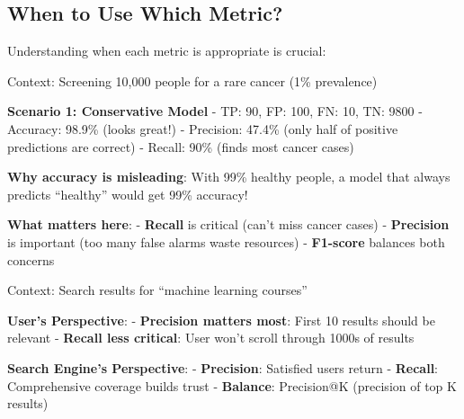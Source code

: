 \documentclass{article}
\newcounter{example}
\begin{document}
\begin{center}
\end{center}

\subsection{When to Use Which Metric?}

Understanding when each metric is appropriate is crucial:

\begin{tcolorbox}[colback=yellow!5!white,colframe=yellow!75!black,title=Example \stepcounter{example}\#\theexample: Medical Diagnosis - Cancer Detection]
Context: Screening 10,000 people for a rare cancer (1\% prevalence)

\textbf{Scenario 1: Conservative Model}
- TP: 90, FP: 100, FN: 10, TN: 9800
- Accuracy: 98.9\% (looks great!)
- Precision: 47.4\% (only half of positive predictions are correct)
- Recall: 90\% (finds most cancer cases)

\textbf{Why accuracy is misleading}: With 99\% healthy people, a model that always predicts ``healthy'' would get 99\% accuracy!

\textbf{What matters here}:
- \textbf{Recall} is critical (can't miss cancer cases)
- \textbf{Precision} is important (too many false alarms waste resources)
- \textbf{F1-score} balances both concerns
\end{tcolorbox}

\begin{tcolorbox}[colback=cyan!5!white,colframe=cyan!75!black,title=Example \stepcounter{example}\#\theexample: Information Retrieval - Search Engine]
Context: Search results for ``machine learning courses''

\textbf{User's Perspective}:
- \textbf{Precision matters most}: First 10 results should be relevant
- \textbf{Recall less critical}: User won't scroll through 1000s of results

\textbf{Search Engine's Perspective}:
- \textbf{Precision}: Satisfied users return
- \textbf{Recall}: Comprehensive coverage builds trust
- \textbf{Balance}: Precision@K (precision of top K results)
\end{tcolorbox}
\end{document}
